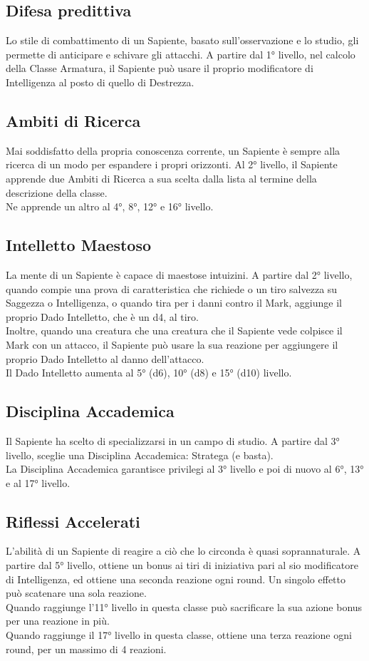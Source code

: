 \subsection{Difesa predittiva}
Lo stile di combattimento di un Sapiente, basato sull'osservazione e lo studio, gli permette di anticipare e schivare gli attacchi. A partire dal 1° livello, nel calcolo della Classe Armatura, il Sapiente può usare il proprio modificatore di Intelligenza al posto di quello di Destrezza.

\subsection{Ambiti di Ricerca}
Mai soddisfatto della propria conoscenza corrente, un Sapiente è sempre alla ricerca di un modo per espandere i propri orizzonti. Al 2° livello, il Sapiente apprende due Ambiti di Ricerca a sua scelta dalla lista al termine della descrizione della classe.\\
Ne apprende un altro al 4°, 8°, 12° e 16° livello.

\subsection{Intelletto Maestoso}
La mente di un Sapiente è capace di maestose intuizini. A partire dal 2° livello, quando compie una prova di caratteristica che richiede o un tiro salvezza su Saggezza o Intelligenza, o quando tira per i danni contro il Mark, aggiunge il proprio Dado Intelletto, che è un d4, al tiro. \\
Inoltre, quando una creatura che una creatura che il Sapiente vede colpisce il Mark con un attacco, il Sapiente può usare la sua reazione per aggiungere il proprio Dado Intelletto al danno dell'attacco. \\
Il Dado Intelletto aumenta al 5° (d6), 10° (d8) e 15° (d10) livello.

\subsection{Disciplina Accademica}
Il Sapiente ha scelto di specializzarsi in un campo di studio. A partire dal 3° livello, sceglie una Disciplina Accademica: Stratega (e basta).\\ La Disciplina Accademica garantisce privilegi al 3° livello e poi di nuovo al 6°, 13° e al 17° livello.

\subsection{Riflessi Accelerati}
L'abilità di un Sapiente di reagire a ciò che lo circonda è quasi soprannaturale. A partire dal 5° livello, ottiene un bonus ai tiri di iniziativa pari al sio modificatore di Intelligenza, ed ottiene una seconda reazione ogni round. Un singolo effetto può scatenare una sola reazione. \\
Quando raggiunge l'11° livello in questa classe può sacrificare la sua azione bonus per una reazione in più.\\
Quando raggiunge il 17° livello in questa classe, ottiene una terza reazione ogni round, per un massimo di 4 reazioni.

